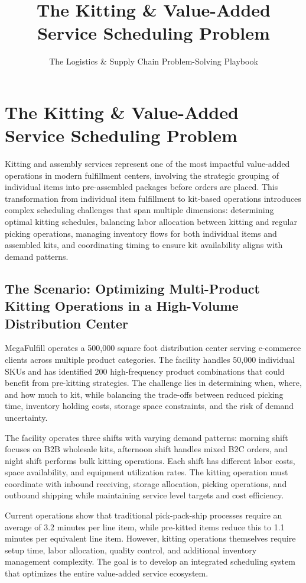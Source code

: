 \documentclass{article}
\title{The Kitting \& Value-Added Service Scheduling Problem}
\author{The Logistics \& Supply Chain Problem-Solving Playbook}
\date{}
\begin{document}
\maketitle

\section{The Kitting \& Value-Added Service Scheduling Problem}

Kitting and assembly services represent one of the most impactful value-added operations in modern fulfillment centers, involving the strategic grouping of individual items into pre-assembled packages before orders are placed. This transformation from individual item fulfillment to kit-based operations introduces complex scheduling challenges that span multiple dimensions: determining optimal kitting schedules, balancing labor allocation between kitting and regular picking operations, managing inventory flows for both individual items and assembled kits, and coordinating timing to ensure kit availability aligns with demand patterns.

\subsection{The Scenario: Optimizing Multi-Product Kitting Operations in a High-Volume Distribution Center}

MegaFulfill operates a 500,000 square foot distribution center serving e-commerce clients across multiple product categories. The facility handles 50,000 individual SKUs and has identified 200 high-frequency product combinations that could benefit from pre-kitting strategies. The challenge lies in determining when, where, and how much to kit, while balancing the trade-offs between reduced picking time, inventory holding costs, storage space constraints, and the risk of demand uncertainty.

The facility operates three shifts with varying demand patterns: morning shift focuses on B2B wholesale kits, afternoon shift handles mixed B2C orders, and night shift performs bulk kitting operations. Each shift has different labor costs, space availability, and equipment utilization rates. The kitting operation must coordinate with inbound receiving, storage allocation, picking operations, and outbound shipping while maintaining service level targets and cost efficiency.

Current operations show that traditional pick-pack-ship processes require an average of 3.2 minutes per line item, while pre-kitted items reduce this to 1.1 minutes per equivalent line item. However, kitting operations themselves require setup time, labor allocation, quality control, and additional inventory management complexity. The goal is to develop an integrated scheduling system that optimizes the entire value-added service ecosystem.
\end{document}
